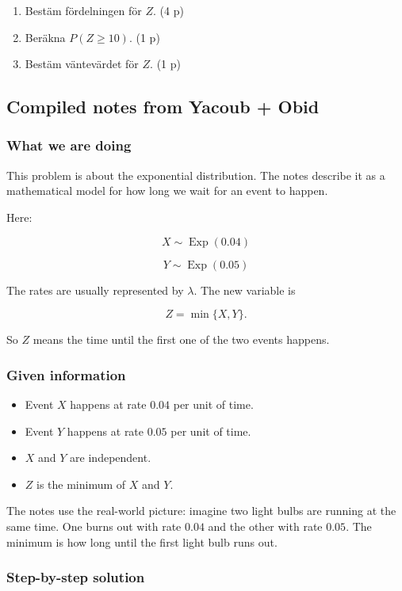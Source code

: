 \documentclass[10pt]{article}
\begin{document}
\begin{enumerate}[label=\alph*)]
\item Bestäm fördelningen för $Z$.
\hfill (4 p)
\item Beräkna $P(Z\geq 10)$.
\hfill (1 p)
\item Bestäm väntevärdet för $Z$.
\hfill (1 p)
\end{enumerate}

\subsection*{Compiled notes from Yacoub + Obid}

\subsubsection*{What we are doing}
This problem is about the exponential distribution.
The notes describe it as a mathematical model for
how long we wait for an event to happen.

Here:

\[
X\sim \operatorname{Exp}(0.04)
\]

\[
Y\sim \operatorname{Exp}(0.05)
\]

The rates are usually represented by $\lambda$.
The new variable is

\[
Z=\min\{X,Y\}.
\]

So $Z$ means the time until the first one of the two
events happens.

\subsubsection*{Given information}
\begin{itemize}
\item Event $X$ happens at rate $0.04$ per unit of time.
\item Event $Y$ happens at rate $0.05$ per unit of time.
\item $X$ and $Y$ are independent.
\item $Z$ is the minimum of $X$ and $Y$.
\end{itemize}

The notes use the real-world picture:
imagine two light bulbs are running at the same time.
One burns out with rate $0.04$ and the other with rate $0.05$.
The minimum is how long until the first light bulb runs out.

\subsubsection*{Step-by-step solution}
\end{document}
